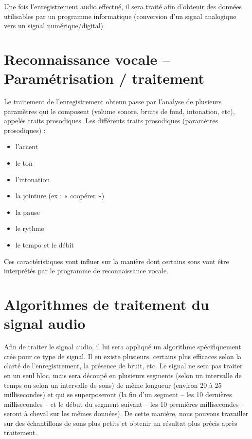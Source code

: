 \documentclass[a4paper, 12pt]{book}
\newcounter{program}[subsection]
\begin{document}
Une fois l’enregistrement audio effectué, il sera traité afin d’obtenir des données utilisables par un programme informatique (conversion d’un signal analogique vers un signal numérique/digital).

\section{Reconnaissance vocale – Paramétrisation / traitement}

Le traitement de l’enregistrement obtenu passe par l’analyse de plusieurs paramètres qui le composent (volume sonore, bruits de fond, intonation, etc), appelés traits prosodiques. Les différents traits prosodiques (paramètres prosodiques) :

\begin{itemize}
    \item l’accent 
    \item le ton 
    \item l’intonation 
    \item la jointure (ex : « coopérer ») 
    \item la pause 
    \item le rythme
    \item le tempo et le débit
\end{itemize}

Ces caractéristiques vont influer sur la manière dont certains sons vont être interprétés par le programme de reconnaissance vocale.

\section{Algorithmes de traitement du signal audio}

Afin de traiter le signal audio, il lui sera appliqué un algorithme spécifiquement crée pour ce type de signal. Il en existe plusieurs, certains plus efficaces selon la clarté de l’enregistrement, la présence de bruit, etc. Le signal ne sera pas traiter en un seul bloc, mais sera découpé en plusieurs segments (selon un intervalle de temps ou selon un intervalle de sons) de même longueur (environ 20 à 25 millisecondes) et qui se superposeront (la fin d’un segment – les 10 dernières millisecondes – et le début du segment suivant – les 10 premières millisecondes – seront à cheval sur les mêmes données). De cette manière, nous pouvons travailler sur des échantillons de sons plus petits et obtenir un résultat plus précis après traitement.
\end{document}
